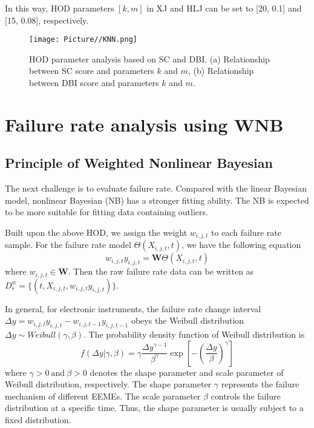 \documentclass[journal,twoside,web]{ieeecolor}
\begin{document}
In this way, HOD parameters $ [ k, m ]$ in XJ and HLJ can be set to [20, 0.1] and [15, 0.08], respectively. 



\begin{figure}
	\centerline{\texttt{[image: Picture//KNN.png]}}
	\caption{HOD parameter analysis based on SC and DBI. (a) Relationship between SC score and parameters $ k $ and $ m $, (b) Relationship between DBI score and parameters $ k $ and $ m $.}
	\label{fig3}
\end{figure}




\section{Failure rate analysis using WNB}
\label{Section2:bayes}

\subsection{Principle of Weighted Nonlinear Bayesian}
The next challenge is to evaluate failure rate. Compared with the linear Bayesian model, nonlinear Bayesian (NB) has a stronger fitting ability.  
The NB is expected to be more suitable for fitting data containing outliers.


Built upon the above HOD, we assign the weight $ w_{i,j,t} $ to each failure rate sample. For the failure rate model $ \Theta(X_{i,j,t}, t) $, we have the following equation
\begin{equation}\label{eq1}
w_{i,j,t}y_{i,j,t}  = \textbf{W} \Theta(X_{i,j,t}, t) 
\end{equation}
where $ w_{i,j,t} \in \textbf{W} $. Then the raw failure rate data can be written as $ D_{r}^{w}=\{(t,  X_{i,j,t},  w_{i,j,t}y_{i,j,t}  )\} $.

In general, for electronic instruments, the failure rate change interval $ \Delta{y} = w_{i,j,t}y_{i,j,t} - w_{i,j,t-1}y_{i,j,t-1}  $ obeys the Weibull distribution \cite{LIU201839} $ \Delta{y} \sim Weibull(\gamma, \beta) $. The probability density function of Weibull distribution is
\begin{equation}\label{eq2_weibull}
f(\Delta{y} | \gamma, \beta) = \gamma \frac{\Delta{y}^{\gamma - 1}}{\beta^{\gamma}}\exp[ -(\frac{\Delta{y}}{\beta})^{\gamma} ]
\end{equation}
where $ \gamma>0 ~ \text{and} ~ \beta >0 $ denotes the shape parameter and scale parameter of Weibull distribution, respectively. The shape parameter $ \gamma $  represents the failure mechanism of different EEMEs. The scale parameter $ \beta $ controls the failure distribution at a specific time. Thus, the shape parameter is usually subject to a fixed distribution. 
\end{document}
